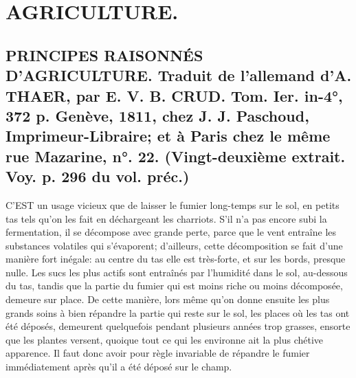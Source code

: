 \setcounter{page}{37}
\chapter{AGRICULTURE.}
\section{PRINCIPES RAISONNÉS D'AGRICULTURE. Traduit de l'allemand d'A. THAER, par E. V. B. CRUD. Tom. Ier. in-4°, 372 p. Genève, 1811, chez J. J. Paschoud, Imprimeur-Libraire; et à Paris chez le même rue Mazarine, n°. 22. \large{(Vingt-deuxième extrait. Voy. p. 296 du vol. préc.)}}
C'EST un usage vicieux que de laisser le fumier long-temps sur le sol, en petits tas tels qu'on les fait en déchargeant les charriots. S'il n'a pas encore subi la fermentation, il se décompose avec grande perte, parce que le vent entraîne les substances volatiles qui s'évaporent; d'ailleurs, cette décomposition se fait d'une manière fort inégale: au centre du tas elle est très-forte, et sur les bords, presque nulle. Les sucs les plus actifs sont entraînés par l'humidité dans le sol, au-dessous du tas, tandis que la partie du fumier qui est moins riche ou moins décomposée, demeure sur place. De cette manière, lors même qu'on donne ensuite les\setcounter{page}{38} plus grands soins à bien répandre la partie qui reste sur le sol, les places où les tas ont été déposés, demeurent quelquefois pendant plusieurs années trop grasses, ensorte que les plantes versent, quoique tout ce qui les environne ait la plus chétive apparence. Il faut donc avoir pour règle invariable de répandre le fumier immédiatement après qu'il a été déposé sur le champ.

